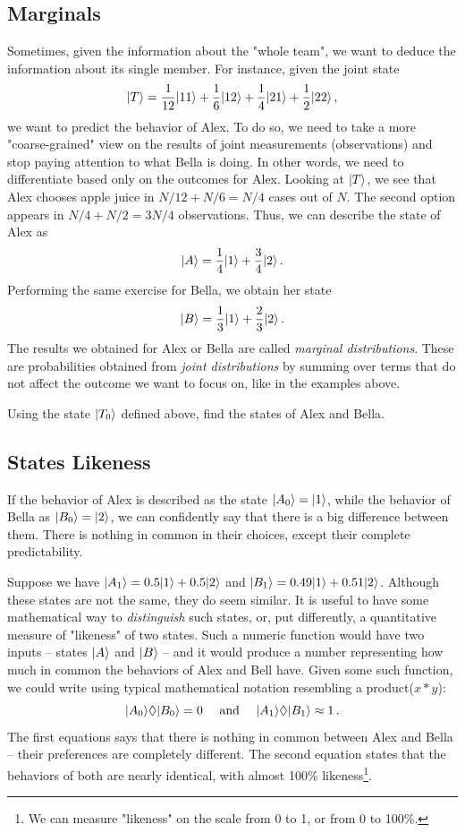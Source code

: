 \subsection{Marginals}
Sometimes, given the information about the "whole team", we want to deduce the information about its single member. For instance, given the joint state
\[
|{T}\rangle = \frac{1}{12}|{11}\rangle + \frac{1}{6}|{12}\rangle + \frac{1}{4}|{21}\rangle+\frac{1}{2}|{22}\rangle\,,
\]
we want to predict the behavior of Alex. To do so, we need to take a more "coarse-grained" view on the results of joint measurements (observations) and stop paying attention to what Bella is doing. In other words, we need to differentiate based only on the outcomes for Alex. Looking at $|{T}\rangle$, we see that Alex chooses apple juice in $N/12 + N/6=N/4$ cases out of $N$. The second option appears in $N/4+N/2=3N/4$ observations. Thus, we can describe the state of Alex as
\[
|{A}\rangle = \frac{1}{4}|{1}\rangle+\frac{3}{4}|{2}\rangle\,.
\]
Performing the same exercise for Bella, we obtain her state
\[
|{B}\rangle = \frac{1}{3}|{1}\rangle + \frac{2}{3}|{2}\rangle\,.
\]
The results we obtained for Alex or Bella are called \emph{marginal distributions}. These are probabilities obtained from \emph{joint distributions} by summing over terms that do not affect the outcome we want to focus on, like in the examples above. 
\begin{exercise}
	Using the state $|{T_0}\rangle$ defined above, find the states of Alex and Bella.
\end{exercise}

\subsection{States Likeness}
If the behavior of Alex is described as the state $|{A_0}\rangle=|{1}\rangle$, while the behavior of Bella as $|{B_0}\rangle=|{2}\rangle$, we can confidently say that there is a big difference between them. There is nothing in common in their choices, except their complete predictability.

Suppose we have $|{A_1}\rangle=0.5|{1}\rangle+0.5|{2}\rangle$ and $|{B_1}\rangle=0.49|{1}\rangle+0.51|{2}\rangle$. Although these states are not the same, they do seem similar. It is useful to have some mathematical way to \emph{distinguish} such states, or, put differently, a quantitative measure of "likeness" of two states. Such a numeric function would have two inputs -- states $|{A}\rangle$ and $|{B}\rangle$ -- and it would produce a number representing how much in common the behaviors of Alex and Bell have. Given some such function, we could write using typical mathematical notation resembling a product($x*y$):
\[
|{A_0}\rangle\lozenge|{B_0}\rangle=0\quad\textrm{ and }\quad |{A_1}\rangle\lozenge|{B_1}\rangle\approx 1\,.
\]
The first equations says that there is nothing in common between Alex and Bella -- their preferences are completely different. The second equation states that the behaviors of both are nearly identical, with almost 100\% likeness\footnote{ We can measure "likeness" on the scale from 0 to 1, or from 0 to 100\%.}.

